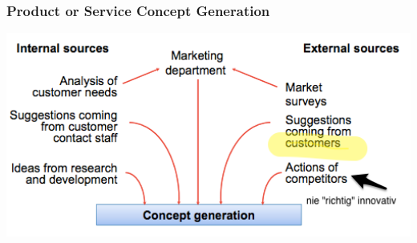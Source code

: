 \subsubsection{Product or Service Concept Generation}
\includegraphics[width=1\textwidth]{W03/conceptgeneration}

